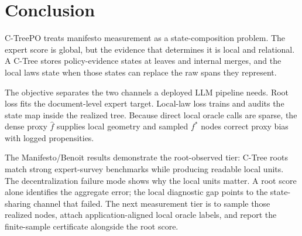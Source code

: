 \section{Conclusion}\label{sec:v8-conclusion}

C-TreePO treats manifesto measurement as a state-composition problem. The
expert score is global, but the evidence that determines it is local and
relational. A C-Tree stores policy-evidence states at leaves and internal
merges, and the local laws state when those states can replace the raw spans
they represent.

The objective separates the two channels a deployed LLM pipeline needs. Root
loss fits the document-level expert target. Local-law loss trains and audits
the state map inside the realized tree. Because direct local oracle calls are
sparse, the dense proxy \(\widehat f\) supplies local geometry and sampled
\(f^\ast\) nodes correct proxy bias with logged propensities.

The Manifesto/Benoit results demonstrate the root-observed tier: C-Tree roots
match strong expert-survey benchmarks while producing readable local units.
The decentralization failure mode shows why the local units matter. A root
score alone identifies the aggregate error; the local diagnostic gap points to
the state-sharing channel that failed. The next measurement tier is to sample
those realized nodes, attach application-aligned local oracle labels, and
report the finite-sample certificate alongside the root score.
